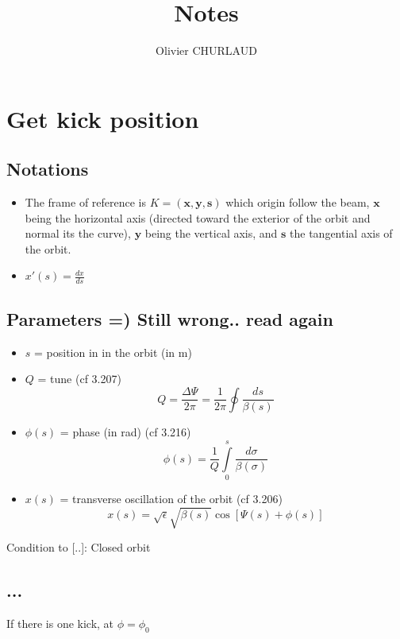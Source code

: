 \documentclass[12pt,a4paper]{article}
\author{Olivier CHURLAUD}
\title{Notes}
\begin{document}
	\maketitle
	
	\section{Get kick position}
	\cite{book:wille}
	\subsection{Notations}
	\begin{itemize}
		\item The frame of reference is $K = (\mathbf{x},\mathbf{y},\mathbf{s})$ which origin follow the beam, $\mathbf{x}$ being the horizontal axis (directed toward the exterior of the orbit and normal its the curve), $\mathbf{y}$ being the vertical axis, and $\mathbf{s}$ the tangential axis of the orbit.
		\item $x'(s) = \frac{dx}{ds}$
	\end{itemize}
	
	\subsection{Parameters =) Still wrong.. read again}
	\begin{itemize}
		\item $s$ = position in in the orbit (in m)
		\item $Q$ = tune (cf 3.207)
		\begin{equation}
			Q = \frac{\Delta \Psi}{2 \pi}= \frac{1}{2 \pi} \oint \frac{ds}{\beta(s)}
		\end{equation}
		
		\item $\phi(s)$ = phase (in rad)  (cf 3.216)
		\begin{equation}
			\phi(s) = \frac{1}{Q} \int\limits_{0}^s \frac{d\sigma}{\beta(\sigma)}
		\end{equation}
		
		\item $x(s)$ = transverse oscillation of the orbit (cf 3.206) 
		\begin{equation}
			x(s) = \sqrt{\epsilon}\sqrt{\beta(s)}\cos[\Psi(s)+\phi(s)]
		\end{equation}
	\end{itemize}
	
	Condition to [..]: Closed orbit
	
	\subsection{...}
	If there is one kick, at $\phi = \phi_0$
	
	
	
	
\end{document}
